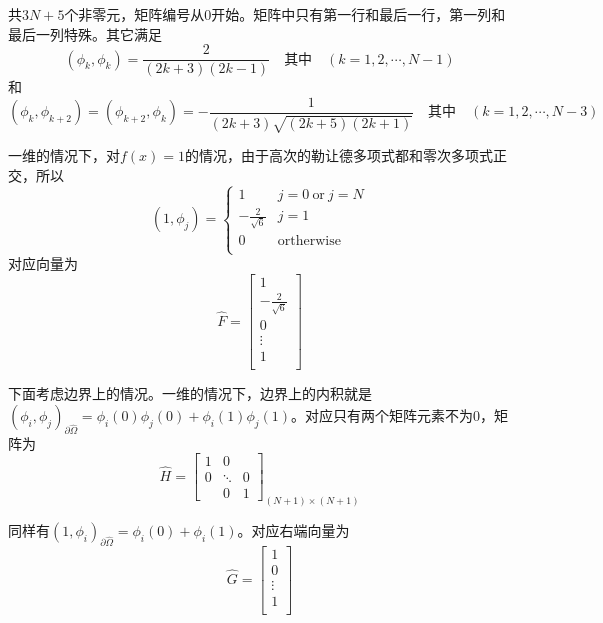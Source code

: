 \documentclass[UTF8,12pt]{article}
\begin{document}
共$3N+5$个非零元，矩阵编号从0开始。矩阵中只有第一行和最后一行，第一列和最后一列特殊。其它满足
$$ (\phi_k, \phi_k) = \frac{2}{(2k+3)(2k-1)} \quad \text{其中} \quad (k = 1, 2, \cdots, N-1) $$
和
$$ (\phi_{k}, \phi_{k+2}) = (\phi_{k+2}, \phi_{k}) = -\frac{1}{(2k+3)\sqrt{(2k+5)(2k+1)}} \quad \text{其中} \quad (k = 1, 2, \cdots, N-3) $$

一维的情况下，对$f(x) = 1$的情况，由于高次的勒让德多项式都和零次多项式正交，所以
\begin{equation}
(1, \phi_j) = \left\{ \begin{array}{ll}
1 & j = 0 \ \text{or} \ j = N \\
-\frac{2}{\sqrt{6}} & j = 1 \\
0 & \text{ortherwise} \\
\end{array}  \right.
\end{equation}
对应向量为
\begin{equation}
\hat{F} = \left[ \begin{array}{c}
1 \\
-\frac{2}{\sqrt{6}} \\
0 \\
\vdots \\
1 \\
\end{array} \right]
\end{equation}

下面考虑边界上的情况。一维的情况下，边界上的内积就是$(\phi_i, \phi_j)_{\partial\hat{\Omega}} = \phi_i(0) \phi_j(0) + \phi_i(1) \phi_j(1)$。对应只有两个矩阵元素不为0，矩阵为
\begin{equation}
\hat{H} = \left[ \begin{array}{ccc}
1 & 0 &  \\ 
0 & \ddots & 0 \\ 
& 0 & 1
\end{array} \right]_{(N+1) \times (N+1)}
\end{equation}

同样有$(1, \phi_i)_{\partial\hat{\Omega}} = \phi_i(0) + \phi_i(1)$。对应右端向量为
\begin{equation}
\hat{G} = \left[ \begin{array}{c}
1 \\
0 \\
\vdots \\
1 \\
\end{array} \right]
\end{equation}
\end{document}
